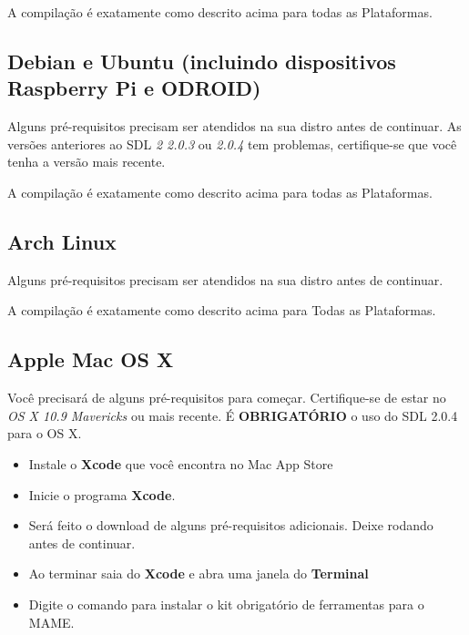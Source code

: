 \documentclass[letterpaper,10pt,brazil]{sphinxmanual}
\begin{document}
A compilação é exatamente como descrito acima para todas as Plataformas.


\subsection{Debian e Ubuntu (incluindo dispositivos Raspberry Pi e ODROID)}
\label{initialsetup/compilingmame:compiling-mame-debian}\label{initialsetup/compilingmame:debian-e-ubuntu-incluindo-dispositivos-raspberry-pi-e-odroid}
Alguns pré-requisitos precisam ser atendidos na sua distro antes de
continuar. As versões anteriores ao SDL \emph{2 2.0.3} ou \emph{2.0.4} tem
problemas, certifique-se que você tenha a versão mais recente.
\begin{quote}

\end{quote}

A compilação é exatamente como descrito acima para todas as Plataformas.


\subsection{Arch Linux}
\label{initialsetup/compilingmame:arch-linux}
Alguns pré-requisitos precisam ser atendidos na sua distro antes de
continuar.
\begin{quote}

\end{quote}

A compilação é exatamente como descrito acima para Todas as Plataformas.


\subsection{Apple Mac OS X}
\label{initialsetup/compilingmame:apple-mac-os-x}
Você precisará de alguns pré-requisitos para começar. Certifique-se de
estar no \emph{OS X 10.9 Mavericks} ou mais recente.
É \textbf{OBRIGATÓRIO} o uso do SDL 2.0.4 para o OS X.
\begin{itemize}
\item {} 
Instale o \textbf{Xcode} que você encontra no Mac App Store

\item {} 
Inicie o programa \textbf{Xcode}.

\item {} 
Será feito o download de alguns pré-requisitos adicionais.
Deixe rodando antes de continuar.

\item {} 
Ao terminar saia do \textbf{Xcode} e abra uma janela do \textbf{Terminal}

\item {} 
Digite o comando  para instalar o kit
obrigatório de ferramentas para o MAME.

\end{itemize}
\end{document}
